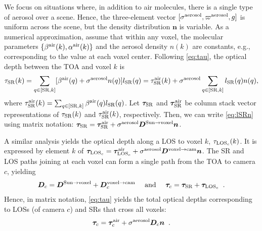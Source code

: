 \documentclass[10pt,letterpaper]{article}
\newcommand{\vect}[1]{\bm{#1}}
\newcommand{\OpDistance}{\bm{D}}
\newcommand{\DistUnknown}{\vect{n}}
\begin{document}
We focus on situations where, in addition to air molecules, there is a
single type of aerosol over a scene. Hence, the three-element vector
$[{\sigma}^{\rm aerosol},\varpi^{\rm aerosol},g]$ is uniform across
the scene, but the density distribution ${\DistUnknown}$ is
variable. As a numerical approximation, assume that within any voxel,
the molecular parameters $\{ \beta^{\rm air}(k),\alpha^{\rm air}(k)\}$
and the aerosol density $n(k)$ are constants, e.g., corresponding to
the value at each voxel center.  Following \cref{eq:tau}, the optical
depth between the TOA and voxel $k$ is
\begin{equation}
  \tau_{\rm SR}(k)=
  \sum_{q \in[{\rm SR},k]}
  [\beta^{\rm air}(q)+\sigma^{\rm aerosol} n(q)] l_{\rm SR}(q)
  =\tau_{\rm SR}^{\rm air}(k)+  \sigma^{\rm aerosol}\sum_{q \in[{\rm SR},k]} l_{\rm SR}(q) n(q)
  ,
  \label{eq:lSRn}
\end{equation}
where $\tau_{\rm SR}^{\rm air}(k)=\sum_{q \in[{\rm SR},k]}\beta^{\rm
  air}(q)l_{\rm SR}(q)$.  Let $\vect{\tau}_{\rm SR}$ and
$\vect{\tau}_{\rm SR}^{\rm air}$ be column stack vector
representations of $\tau_{\rm SR}(k)$ and $\tau_{\rm SR}^{\rm
  air}(k)$, respectively. Then, we can write \cref{eq:lSRn} using
matrix notation: \mbox{$\vect{\tau}_{\rm SR}=\vect{\tau}_{\rm SR}^{\rm
    air} + \sigma^{\rm aerosol}\OpDistance^{\mathrm{Sun \rightarrow
      voxel}} {\DistUnknown}$}.

A similar analysis yields the optical depth along a LOS to voxel $k$,
$\tau_{{\rm LOS}_c}(k)$. It is expressed by element $k$ of
\mbox{$\vect{\tau}_{{\rm LOS}_c}=\vect{\tau}_{{\rm LOS}_c}^{\rm air} +
  \sigma^{\rm aerosol}\OpDistance^{\mathrm{voxel \rightarrow cam}}
  {\DistUnknown}$}.  The SR and LOS paths joining at each voxel can
form a single path from the TOA to camera $c$, yielding
\begin{equation}
  {\bm D}_c=
  {\bm D}^{\mathrm{Sun \rightarrow voxel}}+
  {\bm D}^{\mathrm{voxel \rightarrow cam}}_c
  \quad\text{ and }\quad
  \vect{\tau}_c=
  \vect{\tau}_{\rm SR}+
  \vect{\tau}_{{\rm LOS}_c}
  \;\;.
  \label{eq:D_tau_total}
\end{equation}
Hence, in matrix notation, \cref{eq:tau} yields the total optical
depths corresponding to LOSs (of camera $c$) and SRs that cross all
voxels:
\begin{equation}
  \vect{\tau}_c= \vect{\tau}_c^{\rm air}
  + \sigma^{\rm aerosol} {\bm D}_c {\bm n}
  \;\;.
  \label{eq:tautotal}
\end{equation}
\end{document}
